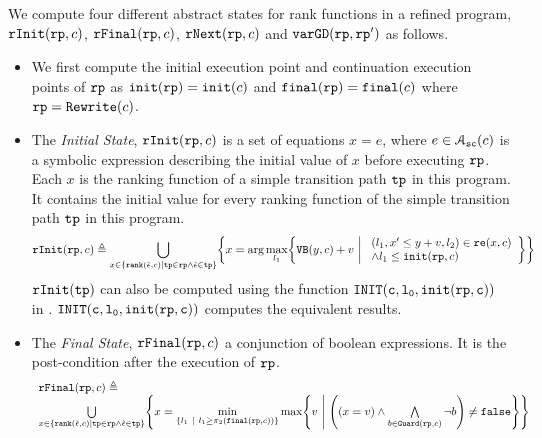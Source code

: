 \begin{defn}
  \label{def:alg-absstate}
  We compute four different abstract states for rank functions in a refined program, $\mathtt{rInit}(\mathtt{rp}, c)$, $\mathtt{rFinal}(\mathtt{rp}, c)$, $\mathtt{rNext}(\mathtt{rp}, c)$ and $\mathtt{varGD}(\mathtt{rp}, \mathtt{rp}')$ as follows.
 \begin{itemize}
  \item We first compute the initial execution point and continuation execution points of $\mathtt{rp}$ as
  $\mathtt{init}(\mathtt{rp}) = \mathtt{init}(c)$
  and 
  $\mathtt{final}(\mathtt{rp}) = \mathtt{final}(c)$ where $\mathtt{rp} = \mathtt{Rewrite}(c)$.
  \item The \emph{Initial State}, 
  $\mathtt{rInit}(\mathtt{rp}, c)$ is a set of equations $x = e$, where $e \in \mathcal{A}_{\mathtt{sc}}(c)$ is a
  symbolic expression describing the initial value of $x$ before executing $\mathtt{rp}$.
  Each $x$ is the ranking function of a simple transition path $\mathtt{tp}$ in this program. 
  It contains the initial value for every ranking function of the simple transition path $\mathtt{tp}$ in this program.
 \[
   \rfinit(\rprog, c) \triangleq 
   \bigcup_{x \in \left\{ \locbound(\absevent, c) | \tpath \in \rprog \land \absevent \in \tpath \right\} }
   \left \{ 
   x = \arg\max_{l_1}\left\{
     \varinvar(y, c) + v ~\middle\vert~ 
     \begin{array}{l} 
       (l_1, x' \leq y + v, l_2) \in \reset(x, c) 
       \\
     \land l_1 \leq \absinit(\rprog, c)
   \end{array}
   \right\}
   \right\}
   \]
 $\mathtt{rInit}(\mathtt{tp})$ can also be computed using the function $\mathtt{INIT(c, l_0, \mathtt{init}(\mathtt{rp}, c))}$ in \cite{GulwaniJK09}. 
 $\mathtt{INIT(c, l_0, \mathtt{init}(\mathtt{rp}, c))}$ computes the equivalent results.
 \item  The \emph{Final State}, $\mathtt{rFinal}(\mathtt{rp}, c)$ a conjunction of boolean expressions.
 It is the post-condition
 after the execution of $\mathtt{rp}$.
 \[
  \begin{array}{l} 
    \rffinal(\rprog, c) \triangleq 
    \\
   \bigcup\limits_{x \in \left\{ \locbound(\absevent, c) | \tpath \in \rprog \land \absevent \in \tpath \right\} }
   \left \{ 
   x = \min\limits_{ \left\{ l_1 ~|~ l_1 \geq \pi_2(\absfinal(\rprog, c)) \right\} }
   \max\left\{
     v ~\middle\vert~ 
     \left( (x = v) \land \bigwedge\limits_{b \in \kw{Guard}(\rprog, c)} \neg b \right) \neq \efalse
   \right\}
   \right\}
  \end{array}
\]
\end{itemize}
\end{defn}
